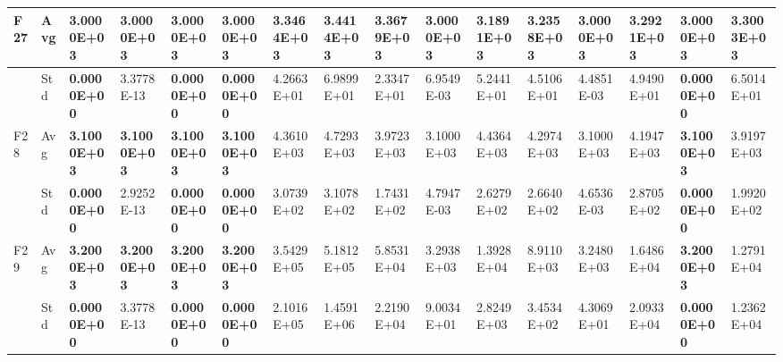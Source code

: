 \documentclass{article} %
\begin{document}
\begin{tabular}{|p{0.3in}|p{0.3in}|p{0.3in}|p{0.3in}|p{0.3in}|p{0.3in}|p{0.3in}|p{0.3in}|p{0.3in}|p{0.3in}|p{0.3in}|p{0.3in}|p{0.3in}|p{0.3in}|p{0.3in}|p{0.5in}|}
F27 & Avg & \textbf{3.0000E+03} & \textbf{3.0000E+03} & \textbf{3.0000E+03} & \textbf{3.0000E+03} & 3.3464E+03 & 3.4414E+03 & 3.3679E+03 & 3.0000E+03 & 3.1891E+03 & 3.2358E+03 & 3.0000E+03 & 3.2921E+03 & \textbf{3.0000E+03} & 3.3003E+03 \\ \hline 
 & Std & \textbf{0.0000E+00} & 3.3778E-13 & \textbf{0.0000E+00} & \textbf{0.0000E+00} & 4.2663E+01 & 6.9899E+01 & 2.3347E+01 & 6.9549E-03 & 5.2441E+01 & 4.5106E+01 & 4.4851E-03 & 4.9490E+01 & \textbf{0.0000E+00} & 6.5014E+01 \\ \hline 
F28 & Avg & \textbf{3.1000E+03} & \textbf{3.1000E+03} & \textbf{3.1000E+03} & \textbf{3.1000E+03} & 4.3610E+03 & 4.7293E+03 & 3.9723E+03 & 3.1000E+03 & 4.4364E+03 & 4.2974E+03 & 3.1000E+03 & 4.1947E+03 & \textbf{3.1000E+03} & 3.9197E+03 \\ \hline 
 & Std & \textbf{0.0000E+00} & 2.9252E-13 & \textbf{0.0000E+00} & \textbf{0.0000E+00} & 3.0739E+02 & 3.1078E+02 & 1.7431E+02 & 4.7947E-03 & 2.6279E+02 & 2.6640E+02 & 4.6536E-03 & 2.8705E+02 & \textbf{0.0000E+00} & 1.9920E+02 \\ \hline 
F29 & Avg & \textbf{3.2000E+03} & \textbf{3.2000E+03} & \textbf{3.2000E+03} & \textbf{3.2000E+03} & 3.5429E+05 & 5.1812E+05 & 5.8531E+04 & 3.2938E+03 & 1.3928E+04 & 8.9110E+03 & 3.2480E+03 & 1.6486E+04 & \textbf{3.2000E+03} & 1.2791E+04 \\ \hline 
 & Std & \textbf{0.0000E+00} & 3.3778E-13 & \textbf{0.0000E+00} & \textbf{0.0000E+00} & 2.1016E+05 & 1.4591E+06 & 2.2190E+04 & 9.0034E+01 & 2.8249E+03 & 3.4534E+02 & 4.3069E+01 & 2.0933E+04 & \textbf{0.0000E+00} & 1.2362E+04 \\ \hline 
\end{tabular}
\end{document}
